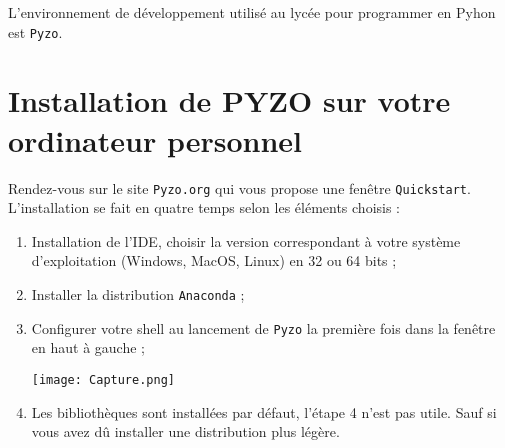\def\xxactivite{Cours}

\fichefalse \proftrue \tdfalse \courstrue

\def\xxnumchapitre{Chapitre 0 \vspace{.2cm}}
\def\xxchapitre{\hspace{.12cm} Utilisation de Python}

\def\xxcompetences{%
\textsl{%
\textbf{Savoirs et compétences :}\\
}}

\def\xxfigures{
}%


\setlength{\columnseprule}{.1pt}

\vspace{2cm}
\pagestyle{fancy}
\thispagestyle{plain}


L'environnement de développement utilisé au lycée pour programmer en Pyhon est \texttt{Pyzo}.
\section{Installation de PYZO sur votre ordinateur personnel}
Rendez-vous sur le site \texttt{Pyzo.org} qui vous propose une fenêtre \texttt{Quickstart}.\\
L'installation se fait en quatre temps selon les éléments choisis :
\begin{enumerate}
\item Installation de l'IDE, choisir la version correspondant à votre système d'exploitation (Windows, MacOS, Linux) en 32 ou 64 bits ;
\item Installer la distribution \texttt{Anaconda} ;
\item Configurer votre shell au lancement de \texttt{Pyzo} la première fois dans la fenêtre en haut à gauche ;

\begin{center}
\texttt{[image: Capture.png]}
\end{center}

\item Les bibliothèques sont installées par défaut, l'étape 4 n'est pas utile. Sauf si vous avez dû installer une distribution plus légère.
\end{enumerate}






